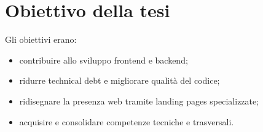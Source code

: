 \chapter{Obiettivo della tesi}
Gli obiettivi erano:
\begin{itemize}
  \item contribuire allo sviluppo frontend e backend;
  \item ridurre technical debt e migliorare qualità del codice;
  \item ridisegnare la presenza web tramite landing pages specializzate;
  \item acquisire e consolidare competenze tecniche e trasversali.
\end{itemize}